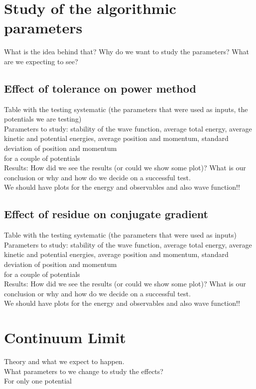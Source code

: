 \documentclass{article}
\begin{document}
\section{Study of the algorithmic parameters}\label{algrmtc parmtrs}
What is the idea behind that?
Why do we want to study the parameters?
What are we expecting to see?\\

\subsection{Effect of tolerance on power method}
Table with the testing systematic (the parameters that were used as inputs, the potentials we are testing)\\
Parameters to study: stability of the wave function, average total energy, average kinetic and potential energies, average position and momentum, standard deviation of position and momentum\\
for a couple of potentials\\
Results: How did we see the results (or could we show some plot)? What is our conclusion or why and how do we decide on a successful test.\\
We should have plots for the energy and observables and also wave function!!\\

\subsection{Effect of residue on conjugate gradient}
Table with the testing systematic (the parameters that were used as inputs)\\
Parameters to study: stability of the wave function, average total energy, average kinetic and potential energies, average position and momentum, standard deviation of position and momentum\\
for a couple of potentials\\
Results: How did we see the results (or could we show some plot)? What is our conclusion or why and how do we decide on a successful test.\\
We should have plots for the energy and observables and also wave function!!\\

\section{Continuum Limit}\label{finitevol}
Theory and what we expect to happen. \\
What parameters to we change to study the effects? \\
For only one potential\\
\end{document}
